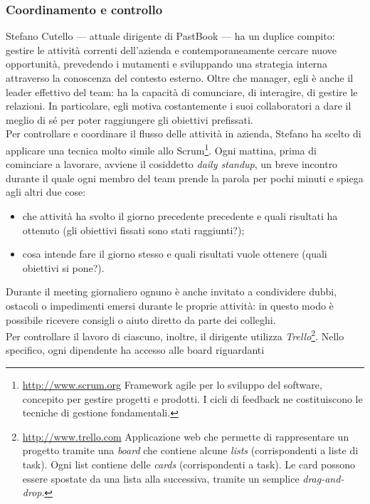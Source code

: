 			\subsubsection{Coordinamento e controllo}
				Stefano Cutello — attuale dirigente di PastBook — ha un duplice compito: gestire le attività correnti dell'azienda e
				contemporaneamente cercare nuove opportunità, prevedendo i mutamenti e sviluppando una strategia interna attraverso
				la conoscenza del contesto esterno. Oltre che manager, egli è anche il leader effettivo del team: ha la capacità di
				comunciare, di interagire, di gestire le relazioni. In particolare, egli motiva costantemente i suoi collaboratori a
				dare il meglio di sé per poter raggiungere gli obiettivi prefissati.\\
				Per controllare e coordinare il flusso delle attività in azienda, Stefano ha scelto di applicare una tecnica molto
				simile allo Scrum\footnote{\url{http://www.scrum.org} Framework agile per lo sviluppo del software, concepito per gestire progetti e prodotti. I cicli di feedback
ne costituiscono le tecniche di gestione fondamentali.}. Ogni mattina, prima di cominciare a lavorare, avviene il
				cosiddetto \emph{daily standup}, un breve incontro durante il quale ogni membro del team prende la parola per pochi
				minuti e spiega agli altri due cose:
				\begin{itemize}
					\item che attività ha svolto il giorno precedente precedente e quali risultati ha ottenuto (gli obiettivi
					fissati sono stati raggiunti?);
					\item cosa intende fare il giorno stesso e quali risultati vuole ottenere (quali obiettivi si pone?).
				\end{itemize}
				Durante il meeting giornaliero ognuno è anche invitato a condividere dubbi, ostacoli o impedimenti emersi durante le
				proprie attività: in questo modo è possibile ricevere consigli o aiuto diretto da parte dei colleghi.\\
				Per controllare il lavoro di ciascuno, inoltre, il dirigente utilizza
				\emph{Trello}\footnote{\url{http://www.trello.com} Applicazione web che permette di rappresentare un progetto tramite una \emph{board} che contiene alcune
\emph{lists} (corrispondenti a liste di task). Ogni list contiene delle \emph{cards} (corrispondenti a task). Le card possono essere spostate da una
lista alla successiva, tramite un semplice \emph{drag-and-drop}.}. Nello specifico, ogni dipendente ha accesso alle board riguardanti
